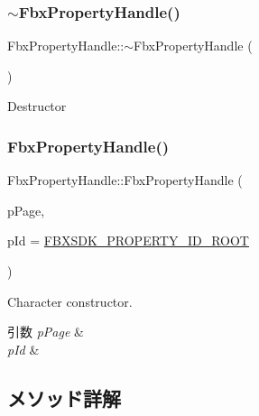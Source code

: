 \subsubsection{\texorpdfstring{$\sim$\+Fbx\+Property\+Handle()}{~FbxPropertyHandle()}}
{\footnotesize\ttfamily Fbx\+Property\+Handle\+::$\sim$\+Fbx\+Property\+Handle (\begin{DoxyParamCaption}{ }\end{DoxyParamCaption})}



Destructor 

\mbox{\label{class_fbx_property_handle_adabd811d9e65f311dbbd5852abac7062}} 
\subsubsection{\texorpdfstring{Fbx\+Property\+Handle()}{FbxPropertyHandle()}\hspace{0.1cm}{\footnotesize\ttfamily [3/3]}}
{\footnotesize\ttfamily Fbx\+Property\+Handle\+::\+Fbx\+Property\+Handle (\begin{DoxyParamCaption}\item[{\hyperlink{class_fbx_property_page}{Fbx\+Property\+Page} $\ast$}]{p\+Page,  }\item[{\hyperlink{fbxtypes_8h_a088fa96de3b0b3ea69f0f6afef525dfb}{Fbx\+Int}}]{p\+Id = {\ttfamily \hyperlink{fbxpropertydef_8h_a291bdb6d8428dce8463143fa3aba2c34}{F\+B\+X\+S\+D\+K\+\_\+\+P\+R\+O\+P\+E\+R\+T\+Y\+\_\+\+I\+D\+\_\+\+R\+O\+OT}} }\end{DoxyParamCaption})}

Character constructor. 
\begin{DoxyParams}{引数}
{\em p\+Page} & \\
\hline
{\em p\+Id} & \\
\hline
\end{DoxyParams}


\subsection{メソッド詳解}
\mbox{\label{class_fbx_property_handle_afcbe2140bff2342bc216f392d6132bb6}} 
